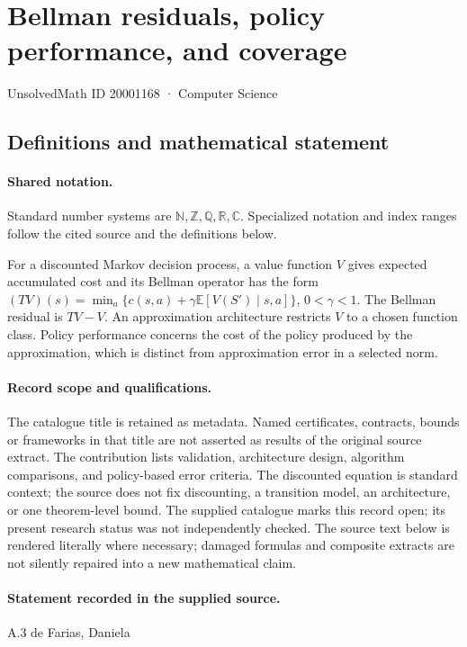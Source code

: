 \documentclass[11pt]{article}
\begin{document}
\setcounter{section}{20001167}
\section{Bellman residuals, policy performance, and coverage}\label{20001168}
{\small\sffamily UnsolvedMath ID 20001168 · Computer Science}
\subsection{Definitions and mathematical statement}

\paragraph{Shared notation.}Standard number systems are $\mathbb N,\mathbb Z,\mathbb Q,\mathbb R,\mathbb C$. Specialized notation and index ranges follow the cited source and the definitions below.


For a discounted Markov decision process, a value function $V$ gives expected accumulated cost and its Bellman operator has the form $(TV)(s)=\min_a\{c(s,a)+\gamma\mathbb E[V(S')\mid s,a]\}$, $0<\gamma<1$. The Bellman residual is $TV-V$. An approximation architecture restricts $V$ to a chosen function class. Policy performance concerns the cost of the policy produced by the approximation, which is distinct from approximation error in a selected norm.
\paragraph{Record scope and qualifications.}
The catalogue title is retained as metadata. Named certificates, contracts, bounds or frameworks in that title are not asserted as results of the original source extract.
The contribution lists validation, architecture design, algorithm comparisons, and policy-based error criteria. The discounted equation is standard context; the source does not fix discounting, a transition model, an architecture, or one theorem-level bound. The supplied catalogue marks this record open; its present research status was not independently checked.
The source text below is rendered literally where necessary; damaged formulas and composite extracts are not silently repaired into a new mathematical claim.
\paragraph{Statement recorded in the supplied source.}
A.3 de Farias, Daniela
\end{document}
